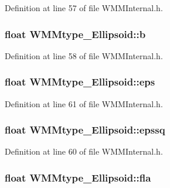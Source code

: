 \-Definition at line 57 of file \-W\-M\-M\-Internal.\-h.

\hypertarget{struct_w_m_mtype___ellipsoid_a6fa136040ff9c95d8681b3ed1522961a}{
\subsubsection[{b}]{\setlength{\rightskip}{0pt plus 5cm}float {\bf \-W\-M\-Mtype\-\_\-\-Ellipsoid\-::b}}}\label{struct_w_m_mtype___ellipsoid_a6fa136040ff9c95d8681b3ed1522961a}


\-Definition at line 58 of file \-W\-M\-M\-Internal.\-h.

\hypertarget{struct_w_m_mtype___ellipsoid_ab0125e1a063bfd086922e84040946912}{
\subsubsection[{eps}]{\setlength{\rightskip}{0pt plus 5cm}float {\bf \-W\-M\-Mtype\-\_\-\-Ellipsoid\-::eps}}}\label{struct_w_m_mtype___ellipsoid_ab0125e1a063bfd086922e84040946912}


\-Definition at line 61 of file \-W\-M\-M\-Internal.\-h.

\hypertarget{struct_w_m_mtype___ellipsoid_a15d66d7d6873c33670330e639d548626}{
\subsubsection[{epssq}]{\setlength{\rightskip}{0pt plus 5cm}float {\bf \-W\-M\-Mtype\-\_\-\-Ellipsoid\-::epssq}}}\label{struct_w_m_mtype___ellipsoid_a15d66d7d6873c33670330e639d548626}


\-Definition at line 60 of file \-W\-M\-M\-Internal.\-h.

\hypertarget{struct_w_m_mtype___ellipsoid_a4bfc3186db2254aa1de93bfd694b420b}{
\subsubsection[{fla}]{\setlength{\rightskip}{0pt plus 5cm}float {\bf \-W\-M\-Mtype\-\_\-\-Ellipsoid\-::fla}}}\label{struct_w_m_mtype___ellipsoid_a4bfc3186db2254aa1de93bfd694b420b}



